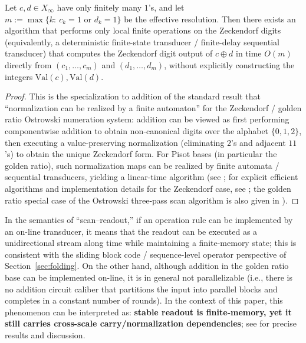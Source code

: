 \begin{theorem}\label{thm:zeckendorf-add-fst}
Let $c,d\in X_\infty$ have only finitely many $1$'s, and let
\(
m:=\max\{k:\ c_k=1\text{ or }d_k=1\}
\)
be the effective resolution. Then there exists an algorithm that performs only local finite operations on the Zeckendorf digits (equivalently, a deterministic finite-state transducer / finite-delay sequential transducer) that computes the Zeckendorf digit output of $c\oplus d$ in time $O(m)$ directly from $(c_1,\dots,c_m)$ and $(d_1,\dots,d_m)$, without explicitly constructing the integers $\mathrm{Val}(c),\mathrm{Val}(d)$.
\end{theorem}

\begin{proof}
This is the specialization to addition of the standard result that ``normalization can be realized by a finite automaton'' for the Zeckendorf / golden ratio Ostrowski numeration system: addition can be viewed as first performing componentwise addition to obtain non-canonical digits over the alphabet $\{0,1,2\}$, then executing a value-preserving normalization (eliminating $2$'s and adjacent $11$'s) to obtain the unique Zeckendorf form. For Pisot bases (in particular the golden ratio), such normalization maps can be realized by finite automata / sequential transducers, yielding a linear-time algorithm (see \cite{Frougny1992NumbersAutomata,Frougny1999OnlineAddition}; for explicit efficient algorithms and implementation details for the Zeckendorf case, see \cite{AhlbachUsatineFrougnyPippenger2013}; the golden ratio special case of the Ostrowski three-pass scan algorithm is also given in \cite{HieronymiTerry2018OstrowskiAddition}).
\end{proof}

\begin{remark}\label{rem:online-not-parallel}
In the semantics of ``scan--readout,'' if an operation rule can be implemented by an on-line transducer, it means that the readout can be executed as a unidirectional stream along time while maintaining a finite-memory state; this is consistent with the sliding block code / sequence-level operator perspective of Section~\ref{sec:folding}. On the other hand, although addition in the golden ratio base can be implemented on-line, it is in general not parallelizable (i.e., there is no addition circuit caliber that partitions the input into parallel blocks and completes in a constant number of rounds). In the context of this paper, this phenomenon can be interpreted as: \textbf{stable readout is finite-memory, yet it still carries cross-scale carry/normalization dependencies}; see \cite{Frougny1999OnlineAddition} for precise results and discussion.
\end{remark}
